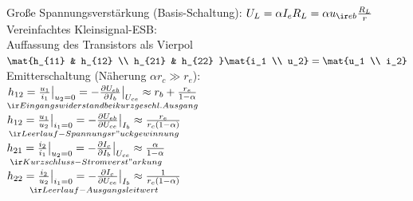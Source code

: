 \documentclass[fs, footer]{latex4ei}
\begin{document}
\begin{multicols*}{4}
Große Spannungsverstärkung (Basis-Schaltung): $U_L = \alpha I_eR_L = \alpha u_{\ir eb} \frac{R_L}{r}$\\
Vereinfachtes Kleinsignal-ESB:\\
Auffassung des Transistors als Vierpol\\
$\mat{h_{11} & h_{12} \\ h_{21} & h_{22} } \mat{i_1 \\ u_2} = \mat{u_1 \\ i_2}$\\
Emitterschaltung (Näherung $\alpha r_c \gg r_e$):\\
$\underset{\ir Eingangswiderstand bei kurzgeschl. Ausgang}{h_{12} = \frac{u_1}{i_1}\big|_{u_2=0} = -\frac{\partial U_{eb}}{\partial I_b}\big|_{U_{ce}} \approx r_b+\frac{r_e}{1-\alpha}}$ \ \\
$\underset{\ir Leerlauf-Spannungsr"uckgewinnung}{h_{12} = \frac{u_1}{u_2}\big|_{i_1=0} = -\frac{\partial U_{eb}}{\partial U_{ce}}\big|_{I_b} \approx \frac{r_e}{r_c(1-\alpha)}}$ \\
$\underset{\ir Kurzschluss-Stromverst"arkung}{h_{21} = \frac{i_2}{i_1}\big|_{u_2=0} = -\frac{\partial I_c}{\partial I_b}\big|_{U_{ce}} \approx \frac{\alpha}{1-\alpha}}$\\
$\underset{\ir Leerlauf-Ausgangsleitwert}{h_{22} = \frac{i_2}{u_2}\big|_{i_1=0} = -\frac{\partial I_c}{\partial U_{ce}}\big|_{I_b} \approx \frac{1}{r_c(1-\alpha)}}$\\
\end{multicols*}

\end{document}
